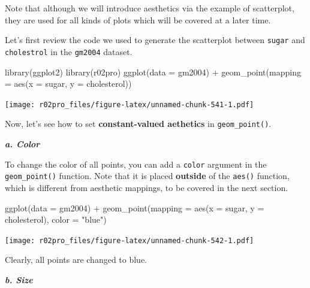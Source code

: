 \documentclass[
]{book}
\newenvironment{Shaded}{\begin{snugshade}}{\end{snugshade}}
\newcommand{\AttributeTok}[1]{\textcolor[rgb]{0.77,0.63,0.00}{#1}}
\newcommand{\FunctionTok}[1]{\textcolor[rgb]{0.00,0.00,0.00}{#1}}
\newcommand{\NormalTok}[1]{#1}
\newcommand{\SpecialCharTok}[1]{\textcolor[rgb]{0.00,0.00,0.00}{#1}}
\newcommand{\StringTok}[1]{\textcolor[rgb]{0.31,0.60,0.02}{#1}}
\newenvironment{blackbox}{
  \definecolor{shadecolor}{rgb}{0, 0, 0}  %
  \color{white}
  \begin{shaded}}
 {\end{shaded}}
\newenvironment{infobox}[1]
  {
  \begin{itemize}
  \renewcommand{\labelitemi}{
    \raisebox{-.7\height}[0pt][0pt]{
      {\setkeys{Gin}{width=3em,keepaspectratio}
        \texttt{[image: pics/\#1]}}
    }
  }
  \setlength{\fboxsep}{1em}
  \begin{blackbox}
  \item
  }
  {
  \end{blackbox}
  \end{itemize}
  }
\begin{document}
\begin{infobox}{caution}
Note that although we will introduce aesthetics via the example of scatterplot, they are used for all kinds of plots which will be covered at a later time.

\end{infobox}

Let's first review the code we used to generate the scatterplot between \texttt{sugar} and \texttt{cholestrol} in the \texttt{gm2004} dataset.

\begin{Shaded}
\begin{Highlighting}[]
\FunctionTok{library}\NormalTok{(ggplot2)}
\FunctionTok{library}\NormalTok{(r02pro)}
\FunctionTok{ggplot}\NormalTok{(}\AttributeTok{data =}\NormalTok{ gm2004) }\SpecialCharTok{+} 
  \FunctionTok{geom\_point}\NormalTok{(}\AttributeTok{mapping =} \FunctionTok{aes}\NormalTok{(}\AttributeTok{x =}\NormalTok{ sugar, }\AttributeTok{y =}\NormalTok{ cholesterol))}
\end{Highlighting}
\end{Shaded}

\texttt{[image: r02pro\_files/figure-latex/unnamed-chunk-541-1.pdf]}

Now, let's see how to set \textbf{constant-valued aethetics} in \texttt{geom\_point()}.

\textbf{\emph{a. Color}}

To change the color of all points, you can add a \texttt{color} argument in the \texttt{geom\_point()} function. Note that it is placed \textbf{outside} of the \texttt{aes()} function, which is different from aesthetic mappings, to be covered in the next section.

\begin{Shaded}
\begin{Highlighting}[]
\FunctionTok{ggplot}\NormalTok{(}\AttributeTok{data =}\NormalTok{ gm2004) }\SpecialCharTok{+} 
  \FunctionTok{geom\_point}\NormalTok{(}\AttributeTok{mapping =} \FunctionTok{aes}\NormalTok{(}\AttributeTok{x =}\NormalTok{ sugar, }\AttributeTok{y =}\NormalTok{ cholesterol),}
             \AttributeTok{color =} \StringTok{"blue"}\NormalTok{)}
\end{Highlighting}
\end{Shaded}

\texttt{[image: r02pro\_files/figure-latex/unnamed-chunk-542-1.pdf]}

Clearly, all points are changed to blue.

\textbf{\emph{b. Size}}
\end{document}
